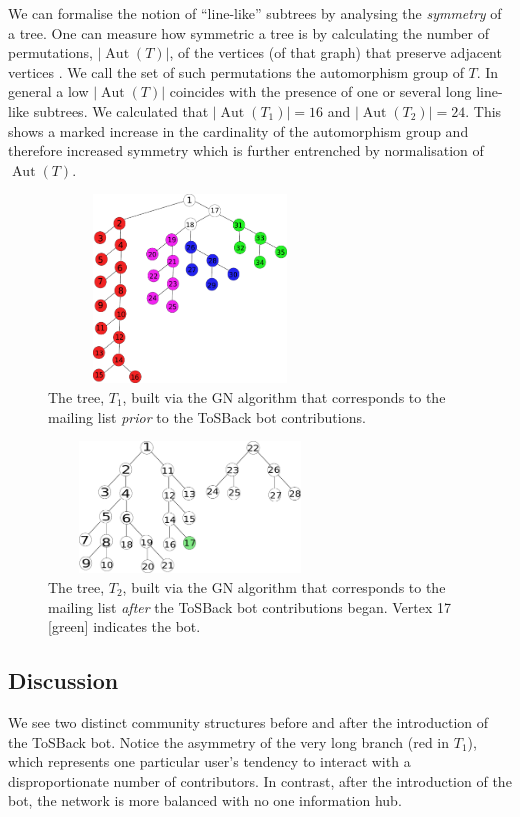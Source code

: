 \documentclass{sig-alternate-2013}
\DeclareMathOperator{\Aut}{Aut}
\begin{document}
We can formalise the notion of “line-like” subtrees by analysing the \emph{symmetry} of  
a tree.  One can measure how symmetric
a tree is by calculating the number of permutations, $\lvert \Aut(T) \rvert$, of the
vertices (of that graph) that preserve adjacent vertices \cite{bela:mgt}. We
call the set of such permutations the automorphism group of $T$. In general a low $\lvert \Aut(T) \rvert$ coincides with the presence of one or several long line-like subtrees.  We calculated that $\lvert \Aut(T_1)\rvert = 16$ and $\vert \Aut(T_2)\rvert = 24$.  This shows a marked
increase in the cardinality of the automorphism group and
therefore increased symmetry which is further entrenched by normalisation of $\Aut(T)$.
\begin{figure}[H]
\includegraphics[width=7.5cm, height  = 5cm]{t15.pdf}\caption{ The tree, $T_1$, built via the GN algorithm that corresponds to the mailing list \emph{prior} to the ToSBack bot contributions.}\label{fig:t1}
\end{figure}
\begin{figure}[H]
\includegraphics[width=7.5cm, height=3.5cm]{t26.pdf}\caption[width=7]{ The tree, $T_2$, built via the GN algorithm that corresponds to the mailing list \emph{after} the ToSBack bot contributions began.  Vertex 17 [green] indicates the bot. }\label{fig:t2}
\end{figure}

\subsection{Discussion}
We see two distinct community structures before and after the introduction of the ToSBack bot. Notice the asymmetry of the very long branch (red in $T_1$), which represents one particular user's tendency to interact with a disproportionate number of contributors. In contrast, after the introduction of the bot, the network is more balanced with no one information hub. %
\end{document}
